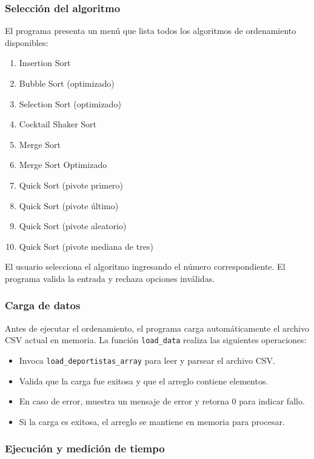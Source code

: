 \subsubsection{Selección del algoritmo}

El programa presenta un menú que lista todos los algoritmos de ordenamiento disponibles:

\begin{enumerate}
    \item Insertion Sort
    \item Bubble Sort (optimizado)
    \item Selection Sort (optimizado)
    \item Cocktail Shaker Sort
    \item Merge Sort
    \item Merge Sort Optimizado
    \item Quick Sort (pivote primero)
    \item Quick Sort (pivote último)
    \item Quick Sort (pivote aleatorio)
    \item Quick Sort (pivote mediana de tres)
\end{enumerate}

El usuario selecciona el algoritmo ingresando el número correspondiente. El programa valida la entrada y rechaza opciones inválidas.

\subsubsection{Carga de datos}

Antes de ejecutar el ordenamiento, el programa carga automáticamente el archivo CSV actual en memoria. La función \texttt{load\_data} realiza las siguientes operaciones:

\begin{itemize}
    \item Invoca \texttt{load\_deportistas\_array} para leer y parsear el archivo CSV.
    \item Valida que la carga fue exitosa y que el arreglo contiene elementos.
    \item En caso de error, muestra un mensaje de error y retorna 0 para indicar fallo.
    \item Si la carga es exitosa, el arreglo se mantiene en memoria para procesar.
\end{itemize}

\subsubsection{Ejecución y medición de tiempo}


